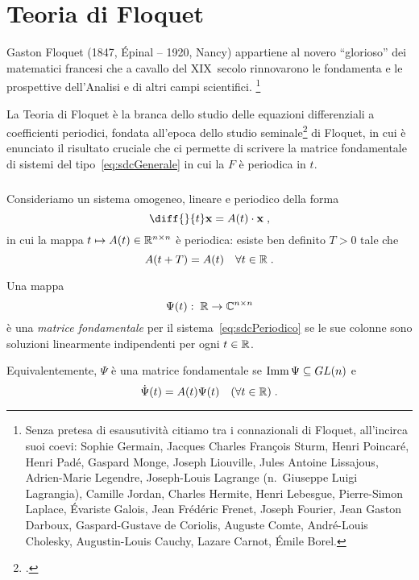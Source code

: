 \chapter{Teoria di Floquet}
\label{chap:floquetTheory}
Gaston Floquet (1847, Épinal -- 1920, Nancy)
appartiene al novero ``glorioso'' dei matematici francesi che a cavallo del XIX~secolo rinnovarono
le fondamenta e le prospettive dell'Analisi e di altri campi scientifici.
\footnote{Senza pretesa di esausutività citiamo tra i connazionali di Floquet, all'incirca suoi coevi: Sophie Germain,
Jacques Charles François Sturm, Henri Poincaré, Henri Padé, Gaspard Monge, Joseph Liouville,
Jules Antoine Lissajous, Adrien-Marie Legendre, Joseph-Louis Lagrange (n.~Giuseppe Luigi Lagrangia),
Camille Jordan, Charles Hermite, Henri Lebesgue, Pierre-Simon Laplace,
Évariste Galois, Jean Frédéric Frenet, Joseph Fourier, Jean Gaston Darboux, Gaspard-Gustave de Coriolis,
Auguste Comte, André-Louis Cholesky, Augustin-Louis Cauchy, Lazare Carnot, Émile Borel.}

La Teoria di Floquet è la branca dello studio delle equazioni differenziali a coefficienti periodici,
fondata all'epoca dello studio seminale\footcite{gFloquet} di Floquet, in cui è enunciato il
risultato cruciale che ci permette di scrivere la matrice fondamentale di sistemi del tipo~\eqref{eq:sdcGenerale}
in cui la $F$ è periodica in $t$.

\paragraph{}
Consideriamo un sistema omogeneo, lineare e periodico della forma
\begin{equation}
    \diff{}{t} \mathbf{x} = A(t) \cdot \mathbf{x} \; ,
    \label{eq:sdcPeriodico}
\end{equation}
in cui la mappa $t \mapsto A(t) \in \mathbb{R}^{n \times n}$ è periodica: esiste ben definito $T >0$ tale che
$$A(t+T) =A(t) \quad \forall t \in \mathbb{R} \; .$$

\begin{definizione}
    Una mappa
    $$\Psi (t) : \; \mathbb{R} \rightarrow \mathbb{C}^{n \times n}$$
    è una \emph{matrice fondamentale} per il sistema~\eqref{eq:sdcPeriodico} se le sue colonne sono soluzioni
    linearmente indipendenti per ogni $t \in \mathbb{R}$.
\end{definizione}
Equivalentemente, $\Psi$ è una matrice fondamentale se $\operatorname{Imm} \Psi \subseteq GL(n)$ e
$$ \dot{\Psi} (t) = A(t) \Psi (t) \quad (\forall t \in \mathbb{R}) \; .$$

